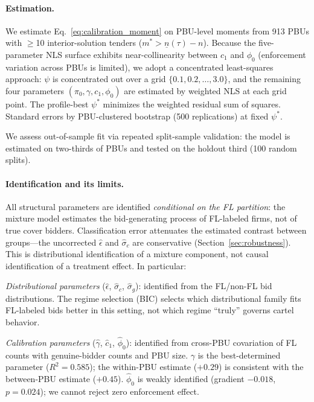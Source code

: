\paragraph{Estimation.}
We estimate Eq.~\eqref{eq:calibration_moment} on PBU-level moments
from 913 PBUs with $\geq$10 interior-solution tenders ($m^* >
\underline{n}(\tau) - n$). Because the five-parameter NLS surface
exhibits near-collinearity between $c_1$ and $\phi_0$ (enforcement
variation across PBUs is limited), we adopt a concentrated least-squares
approach: $\psi$ is concentrated out over a grid
$\{0.1, 0.2, \ldots, 3.0\}$, and the remaining four parameters
$(\pi_0, \gamma, c_1, \phi_0)$ are estimated by weighted NLS at each
grid point. The profile-best $\psi^*$ minimizes the weighted residual
sum of squares. Standard errors by PBU-clustered bootstrap (500
replications) at fixed $\psi^*$.

We assess out-of-sample fit via repeated split-sample validation:
the model is estimated on two-thirds of PBUs and tested on the
holdout third (100 random splits).

\paragraph{Identification and its limits.}
All structural parameters are identified \emph{conditional on the FL
partition}: the mixture model estimates the bid-generating process of
FL-labeled firms, not of true cover bidders. Classification error
attenuates the estimated contrast between groups---the uncorrected
$\hat{\epsilon}$ and $\hat{\sigma}_c$ are conservative
(Section~\ref{sec:robustness}). This is distributional
identification of a mixture component, not causal identification of
a treatment effect. In particular:

\emph{Distributional parameters} ($\hat{\epsilon}$,
$\hat{\sigma}_c$, $\hat{\sigma}_g$): identified from the FL/non-FL
bid distributions. The regime selection (BIC) selects which distributional family
fits FL-labeled bids better in this setting, not which regime
``truly'' governs cartel behavior.

\emph{Calibration parameters} ($\hat{\gamma}$, $\hat{c}_1$,
$\hat{\phi}_0$): identified from cross-PBU covariation of FL counts
with genuine-bidder counts and PBU size. $\gamma$ is the
best-determined parameter ($R^2 = 0.585$); the within-PBU estimate
($+0.29$) is consistent with the between-PBU estimate ($+0.45$).
$\hat{\phi}_0$ is weakly identified (gradient $-0.018$,
$p = 0.024$); we cannot reject zero enforcement effect.

